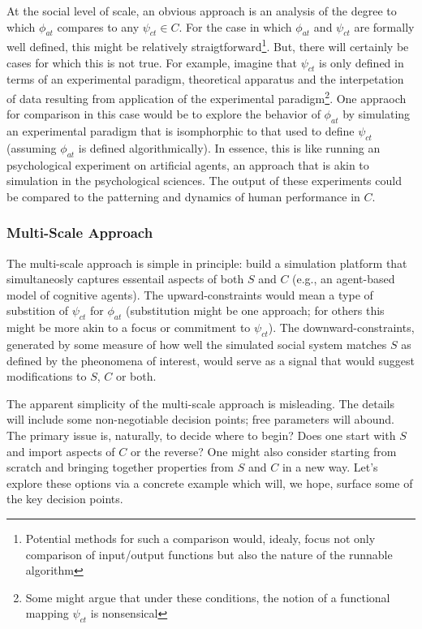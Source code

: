\documentclass{article}
\begin{document}
At the social level of scale, an obvious approach is an analysis of the degree to which $\phi_{at}$ compares to any $\psi_{ct} \in C$.  For the case in which $\phi_{at}$ and $\psi_{ct}$ are formally well defined, this might be relatively straigtforward\footnote{Potential methods for such a comparison would, idealy, focus not only comparison of input/output functions but also the nature of the runnable algorithm}.  But, there will certainly be cases for which this is not true.  For example, imagine that $\psi_{ct}$ is only defined in terms of an experimental paradigm, theoretical apparatus and the interpetation of data resulting from application of the experimental paradigm\footnote{Some might argue that under these conditions, the notion of a functional mapping $\psi_{ct}$ is nonsensical}.  One appraoch for comparison in this case would be to explore the behavior of $\phi_{at}$ by simulating an experimental paradigm that is isomphorphic to that used to define $\psi_{ct}$ (assuming $\phi_{at}$ is defined algorithmically).  In essence, this is like running an psychological experiment on artificial agents, an approach that is akin to simulation in the psychological sciences.  The output of these experiments could be compared to the patterning and dynamics of human performance in $C$.  

 \subsubsection{Multi-Scale Approach}
The multi-scale approach is simple in principle: build a simulation platform that simultaneosly captures essentail aspects of both $S$ and $C$ (e.g., an agent-based model of cognitive agents).  The upward-constraints would mean a type of substition of $\psi_{ct}$ for $\phi_{at}$ (substitution might be one approach; for others this might be more akin to a focus or commitment to $\psi_{ct}$). The downward-constraints, generated by some measure of how well the simulated social system matches $S$ as defined by the pheonomena of interest, would serve as a signal that would suggest modifications to $S$, $C$ or both.  

The apparent simplicity of the multi-scale approach is misleading.  The details will include some non-negotiable decision points; free parameters will abound.  The primary issue is, naturally, to decide where to begin?  Does one start with $S$ and import aspects of $C$ or the reverse?  One might also consider starting from scratch and bringing together properties from $S$ and $C$ in a new way. Let's explore these options via a concrete example which will, we hope, surface some of the key decision points.  
\end{document}
